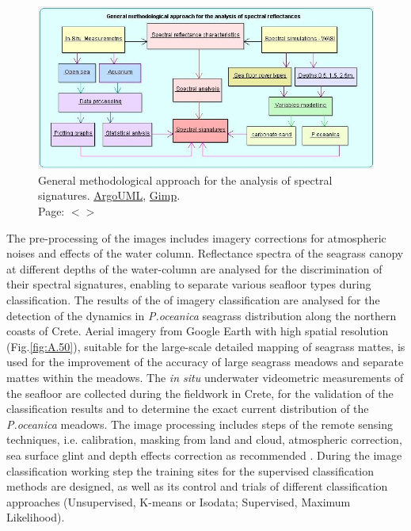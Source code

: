 \documentclass[11pt]{article}
\begin{document}
\begin{figure}[H]
	\centering
	\includegraphics[scale=0.63]{UML_ClassDiagram.jpg}
	\caption{General methodological approach for the analysis of spectral signatures. \href{http://argouml.tigris.org/}{ArgoUML}, \href{http://www.gimp.org/}{Gimp}. \\ Page: $<$\pageref{page-9}$>$}
	\label{fig:1.10}
\end{figure}

The pre-processing of the images includes imagery corrections for atmospheric noises and effects of the water
column. Reflectance spectra of the seagrass canopy at different depths of the water-column are
analysed for the discrimination of their spectral signatures, enabling to separate various seafloor types
during classification. The results of the of imagery classification are analysed for the detection of the
dynamics in \textit{P.oceanica} seagrass distribution along the northern coasts of Crete. Aerial imagery from
Google Earth with high spatial resolution (Fig.\ref{fig:A.50})\label{GG-2}, suitable for the large-scale detailed mapping of seagrass
mattes, is used for the improvement of the accuracy of large seagrass meadows and separate mattes
within the meadows. The \textit{in situ} underwater videometric measurements of the seafloor are collected
during the fieldwork in Crete, for the validation of the classification results and to determine the exact
current distribution of the \textit{P.oceanica} meadows. The image processing includes steps of the remote
sensing techniques, i.e. calibration, masking from land and cloud, atmospheric correction, sea surface
glint and depth effects correction as recommended \cite{Matarrese08}\label{Matarrese08}. During the image classification
working step the training sites for the supervised classification methods are designed, as well as its
control and trials of different classification approaches (Unsupervised, K-means or Isodata;
Supervised, Maximum Likelihood).
\pagebreak
\end{document}
